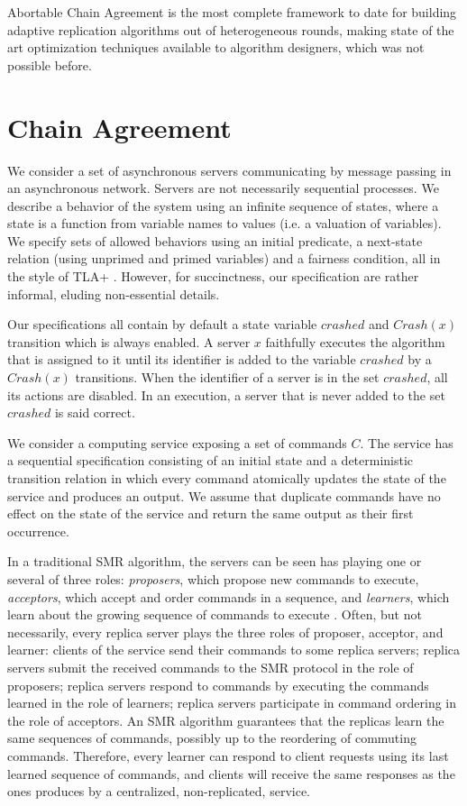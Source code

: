 Abortable Chain Agreement is the most complete framework to date for building
adaptive replication algorithms out of heterogeneous rounds, making state of the
art optimization techniques available to algorithm designers, which was not
possible before.

\section{Chain Agreement}
\label{sec:ca}

We consider a set of asynchronous servers communicating by message passing in an
asynchronous network. Servers are not necessarily sequential processes. We
describe a behavior of the system using an infinite sequence of states, where a
state is a function from variable names to values (i.e. a valuation
of variables).  We specify sets of allowed behaviors using an initial predicate,
a next-state relation (using unprimed and primed variables) and a fairness
condition, all in the style of TLA+ \cite{Lamport02SpecifyingSystems}. However,
for succinctness, our specification are rather informal, eluding non-essential
details.

Our specifications all contain by default a state variable $crashed$ and
$Crash\left( x \right)$ transition which is always enabled. A server $x$ faithfully
executes the algorithm that is assigned to it until its identifier is added to
the variable $crashed$ by a $Crash\left( x \right)$ transitions.  When the identifier of a
server is in the set $crashed$, all its actions are disabled.  In an execution,
a server that is never added to the set $crashed$ is said correct.

We consider a computing service exposing a set of commands $C$. The
service has a sequential specification consisting of an initial state
and a deterministic transition relation in which every command
atomically updates the state of the service and produces an output. We
assume that duplicate commands have no effect on the state of the
service and return the same output as their first occurrence.

In a traditional SMR algorithm, the servers can be seen has playing one or
several of three roles: \emph{proposers}, which propose new commands to execute,
\emph{acceptors}, which accept and order commands in a sequence, and
\emph{learners}, which learn about the growing sequence of commands to
execute \cite{lamport2001paxos}. Often, but not necessarily, every replica server plays the
three roles of proposer, acceptor, and learner: clients of the service
send their commands to some replica servers; replica servers submit
the received commands to the SMR protocol in the role of proposers;
replica servers respond to commands by executing the commands learned
in the role of learners; replica servers participate in command
ordering in the role of acceptors.  An SMR algorithm guarantees that
the replicas learn the same sequences of commands, possibly up to the
reordering of commuting commands. Therefore, every learner can respond to client
requests using its last learned sequence of commands, and clients will receive
the same responses as the ones produces by a centralized, non-replicated,
service. 


